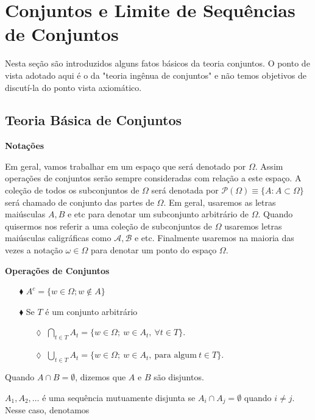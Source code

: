 \chapter[Aula 1]{Conjuntos e Limite de Sequências de Conjuntos}
\chaptermark{}

Nesta seção são introduzidos alguns fatos básicos da teoria
conjuntos. O ponto de vista adotado aqui é o da "teoria ingênua
de conjuntos" e não temos objetivos de discutí-la do ponto 
vista axiomático.

  
\section{Teoria Básica de Conjuntos}
\textbf{Notações}

Em geral, vamos trabalhar em um espaço que será denotado 
por $\Omega$. Assim operações de conjuntos serão sempre 
consideradas com relação a este espaço. 
A coleção de todos os subconjuntos de $\Omega$ será 
denotada por $\mathcal{P}(\Omega)\equiv \{A: A\subset \Omega\}$
será chamado de conjunto das partes de $\Omega$.
Em geral, usaremos as letras maiúsculas $A,B$ e etc para denotar
um subconjunto arbitrário de $\Omega$. Quando quisermos nos referir
a uma coleção de subconjuntos de $\Omega$ usaremos letras maiúsculas 
caligráficas como $\mathcal{A}, \mathcal{B}$ e etc. Finalmente
usaremos na maioria das vezes a notação $\omega\in\Omega$ 
para denotar um ponto do espaço $\Omega$.



\textbf{Operações de Conjuntos}


\begin{enumerate}
\item[$\blacklozenge$] $A^{c}= \{w \in \Omega; w \notin A\}$
\item[$\blacklozenge$] Se $T$ é um conjunto arbitrário
	\begin{enumerate}
	\item[$\lozenge$]  $\displaystyle\bigcap_{t \in T}{A_t}
							= 
						\{ w \in \Omega;\ w \in A_t,\ \forall t \in T\}$.
	\item[$\lozenge$]  $\displaystyle\bigcup_{t \in T}{A_t}
							= 
						\{ w \in \Omega;\ w \in A_t,\ \text{para algum}\ t \in T \}$.
	\end{enumerate}
\end{enumerate}

Quando $A \cap B = \emptyset$, dizemos que $A$ e $B$ são disjuntos.

$A_1, A_2,\ldots$ é uma sequência mutuamente disjunta se $A_i \cap A_j = \emptyset$ 
quando $i \neq j$. Nesse caso, denotamos

